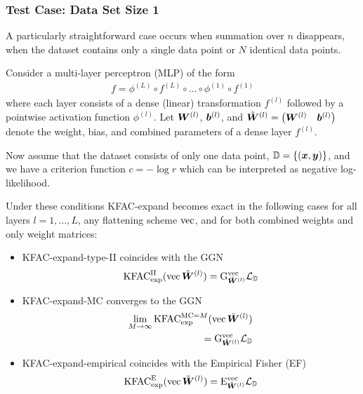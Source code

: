 \switchcolumn[1]
\switchcolumn[0]

\subsubsection{Test Case: Data Set Size 1}
A particularly straightforward case occurs when summation over $n$ disappears, \ie when the dataset contains only a single data point or $N$ identical data points.

\begin{test}\label{test:kfac_expand_linear_no_weight_sharing_batch_size_1}
  Consider a multi-layer perceptron (MLP) of the form
  \begin{align*}
    f = \phi^{(L)} \circ f^{(L)} \circ \ldots \circ \phi^{(1)} \circ f^{(1)}
  \end{align*}
  where each layer consists of a dense (linear) transformation $f^{(l)}$ followed by a pointwise activation function $\phi^{(l)}$.
  Let $\mW^{(l)}$, $\vb^{(l)}$, and $\tilde{\mW}^{(l)} = \begin{pmatrix} \mW^{(l)} & \vb^{(l)} \end{pmatrix}$ denote the weight, bias, and combined parameters of a dense layer $f^{(l)}$.

  Now assume that the dataset consists of only one data point, $\sD = \{ (\vx, \vy) \}$, and we have a criterion function $c = - \log r$ which can be interpreted as negative log-likelihood.

  Under these conditions KFAC-expand becomes exact in the following cases for all layers $l = 1, \dots, L$, any flattening scheme $\vec$, and for both combined weights and only weight matrices:
  \begin{itemize}
  \item KFAC-expand-type-II coincides with the GGN
    \begin{align*}
      \kfac^{\text{II}}_{\text{exp}}(\vec\tilde{\mW}^{(l)}) = \ggn^{\vec}_{\tilde{\mW}^{(l)}}\gL_{\sD}
    \end{align*}
  \item KFAC-expand-MC converges to the GGN
    \begin{align*}
      \lim_{M \to \infty} \kfac^{\text{MC}=M}_{\text{exp}}(\vec\tilde{\mW}^{(l)})
      \\
      = \ggn^{\vec}_{\tilde{\mW}^{(l)}}\gL_{\sD}
    \end{align*}
  \item KFAC-expand-empirical coincides with the Empirical Fisher (EF)
    \begin{align*}
      \kfac^{\text{E}}_{\text{exp}}(\vec\tilde{\mW}^{(l)}) = \ef^{\vec}_{\tilde{\mW}^{(l)}}\gL_{\sD}
    \end{align*}
  \end{itemize}
\end{test}

